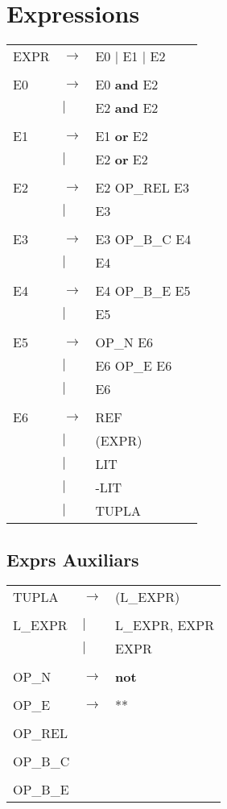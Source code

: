\documentclass{article}
\begin{document}
	\section{Expressions}
	\begin{tabular}{l l l}
		EXPR&$\to$&E0 $|$ E1 $|$ E2\\
		\\
		E0&$\to$&E0 \textbf{and} E2\\
		&$|$&E2 \textbf{and} E2\\
		\\
		E1&$\to$&E1 \textbf{or} E2\\
		&$|$&E2 \textbf{or} E2\\
		\\
		E2&$\to$&E2 OP\_REL E3\\
		&$|$&E3\\
		\\
		E3&$\to$&E3 OP\_B\_C E4\\
		&$|$&E4\\
		\\
		E4&$\to$&E4 OP\_B\_E E5\\
		&$|$&E5\\
		\\
		E5&$\to$&OP\_N E6\\
		&$|$&E6 OP\_E E6\\
		&$|$&E6\\
		\\
		E6&$\to$&REF\\
		&$|$&(EXPR)\\
		&$|$&LIT\\
		&$|$&-LIT\\
		&$|$&TUPLA
	\end{tabular}
	\subsection{Exprs Auxiliars}
	\begin{tabular}{l l l}
		TUPLA&$\to$&(L\_EXPR)\\
		\\
		L\_EXPR&$|$&L\_EXPR, EXPR\\
		&$|$&EXPR\\
		\\
		OP\_N&$\to$&\textbf{not}\\
		\\
		OP\_E&$\to$&**\\
		\\
		OP\_REL\\
		\\
		OP\_B\_C\\
		\\
		OP\_B\_E
	\end{tabular}
\end{document}
